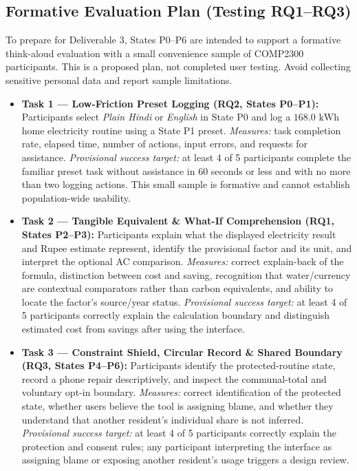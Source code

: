 \documentclass[12pt, a4paper]{article}
\begin{document}
\subsection{Formative Evaluation Plan (Testing RQ1--RQ3)}
To prepare for Deliverable 3, States P0--P6 are intended to support a formative think-aloud evaluation with a small convenience sample of COMP2300 participants. This is a proposed plan, not completed user testing. Avoid collecting sensitive personal data and report sample limitations.
\begin{itemize}
    \item \textbf{Task 1 --- Low-Friction Preset Logging (\textbf{RQ2}, States P0--P1):} Participants select \textit{Plain Hindi} or \textit{English} in State P0 and log a $168.0\text{ kWh}$ home electricity routine using a State P1 preset. \textit{Measures:} task completion rate, elapsed time, number of actions, input errors, and requests for assistance. \textit{Provisional success target:} at least 4 of 5 participants complete the familiar preset task without assistance in 60 seconds or less and with no more than two logging actions. This small sample is formative and cannot establish population-wide usability.
    \item \textbf{Task 2 --- Tangible Equivalent \& What-If Comprehension (\textbf{RQ1}, States P2--P3):} Participants explain what the displayed electricity result and Rupee estimate represent, identify the provisional factor and its unit, and interpret the optional AC comparison. \textit{Measures:} correct explain-back of the formula, distinction between cost and saving, recognition that water/currency are contextual comparators rather than carbon equivalents, and ability to locate the factor's source/year status. \textit{Provisional success target:} at least 4 of 5 participants correctly explain the calculation boundary and distinguish estimated cost from savings after using the interface.
    \item \textbf{Task 3 --- Constraint Shield, Circular Record \& Shared Boundary (\textbf{RQ3}, States P4--P6):} Participants identify the protected-routine state, record a phone repair descriptively, and inspect the communal-total and voluntary opt-in boundary. \textit{Measures:} correct identification of the protected state, whether users believe the tool is assigning blame, and whether they understand that another resident's individual share is not inferred. \textit{Provisional success target:} at least 4 of 5 participants correctly explain the protection and consent rules; any participant interpreting the interface as assigning blame or exposing another resident's usage triggers a design review.
\end{itemize}
\end{document}

